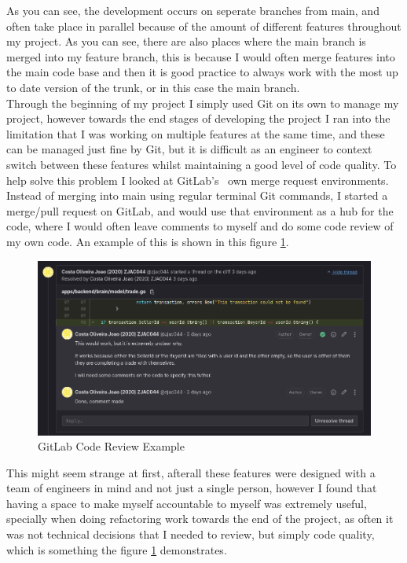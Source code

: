 \documentclass[titlepage]{article}
\begin{document}
As you can see, the development occurs on seperate branches from main, and often take place in parallel because of the amount of different features throughout my project. As you can see, there are also places where the main branch is merged into my feature branch, this is because I would often merge features into the main code base and then it is good practice to always work with the most up to date version of the trunk, or in this case the main branch. \\

Through the beginning of my project I simply used Git on its own to manage my project, however towards the end stages of developing the project I ran into the limitation that I was working on multiple features at the same time, and these can be managed just fine by Git, but it is difficult as an engineer to context switch between these features whilst maintaining a good level of code quality. To help solve this problem I looked at GitLab's~\cite{gitlab_cite} own merge request environments. Instead of merging into main using regular terminal Git commands, I started a merge/pull request on GitLab, and would use that environment as a hub for the code, where I would often leave comments to myself and do some code review of my own code. An example of this is shown in this figure \ref{gitlab}. \\

\begin{figure}[h!]
\includegraphics[width=1.5\textwidth]{../Diagrams/GitLab.png}
  \caption{GitLab Code Review Example}
\hspace*{-3cm}
\label{gitlab}
\end{figure}

This might seem strange at first, afterall these features were designed with a team of engineers in mind and not just a single person, however I found that having a space to make myself accountable to myself was extremely useful, specially when doing refactoring work towards the end of the project, as often it was not technical decisions that I needed to review, but simply code quality, which is something the figure \ref{gitlab} demonstrates. \\
\end{document}
